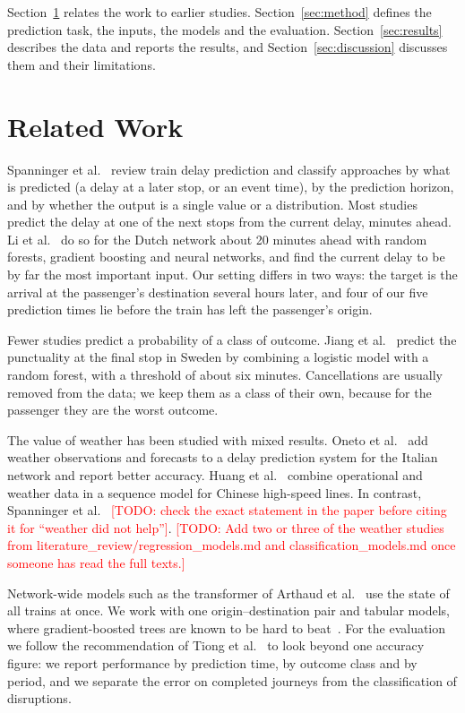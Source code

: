 \documentclass[conference]{IEEEtran}
\newcommand{\todo}[1]{\textcolor{red}{[TODO: #1]}}
\begin{document}
Section~\ref{sec:related} relates the work to earlier studies. Section~\ref{sec:method} defines the
prediction task, the inputs, the models and the evaluation. Section~\ref{sec:results} describes the
data and reports the results, and Section~\ref{sec:discussion} discusses them and their limitations.

\section{Related Work}
\label{sec:related}

Spanninger et al.~\cite{spanninger2022review} review train delay prediction and classify approaches
by what is predicted (a delay at a later stop, or an event time), by the prediction horizon, and by
whether the output is a single value or a distribution. Most studies predict the delay at one of the
next stops from the current delay, minutes ahead. Li et al.~\cite{li2021nearterm} do so for the
Dutch network about 20 minutes ahead with random forests, gradient boosting and neural networks, and
find the current delay to be by far the most important input. Our setting differs in two ways: the
target is the arrival at the passenger's destination several hours later, and four of our five
prediction times lie before the train has left the passenger's origin.

Fewer studies predict a probability of a class of outcome. Jiang et al.~\cite{jiang2019punctuality}
predict the punctuality at the final stop in Sweden by combining a logistic model with a random
forest, with a threshold of about six minutes. Cancellations are usually removed from the data; we
keep them as a class of their own, because for the passenger they are the worst outcome.

The value of weather has been studied with mixed results. Oneto et
al.~\cite{oneto2016weather} add weather observations and forecasts to a delay prediction system for
the Italian network and report better accuracy. Huang et al.~\cite{huang2020sequences} combine
operational and weather data in a sequence model for Chinese high-speed lines. In contrast,
Spanninger et al.~\cite{spanninger2024predictability} \todo{check the exact statement in the paper
before citing it for ``weather did not help''}. \todo{Add two or three of the weather studies from
literature\_review/regression\_models.md and classification\_models.md once someone has read the
full texts.}

Network-wide models such as the transformer of Arthaud et al.~\cite{arthaud2024transformers} use the
state of all trains at once. We work with one origin--destination pair and tabular models, where
gradient-boosted trees are known to be hard to beat~\cite{grinsztajn2022trees}. For the evaluation
we follow the recommendation of Tiong et al.~\cite{tiong2025apgrip} to look beyond one accuracy
figure: we report performance by prediction time, by outcome class and by period, and we separate
the error on completed journeys from the classification of disruptions.
\end{document}
